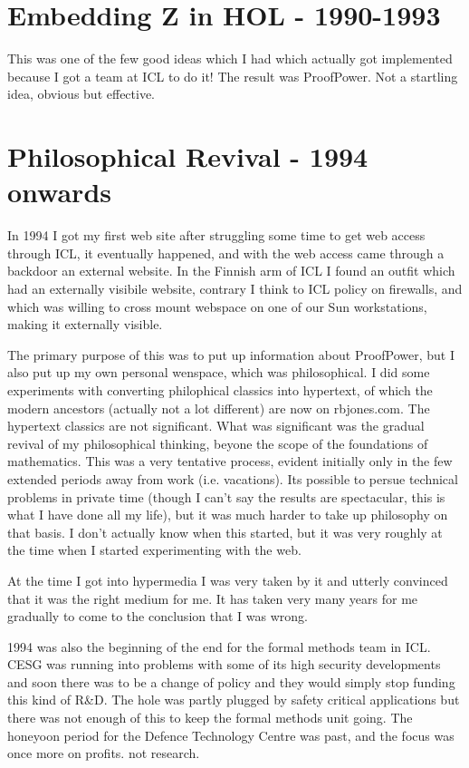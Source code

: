 \documentclass[10pt,titlepage]{book}
\begin{document}
\section{Embedding Z in HOL - 1990-1993}

This was one of the few good ideas which I had which actually got implemented because I got a team at ICL to do it!
The result was ProofPower.
Not a startling idea, obvious but effective.

\section{Philosophical Revival - 1994 onwards}

In 1994 I got my first web site after struggling some time to get web access through ICL, it eventually happened, and with the web access came through a backdoor an external website.
In the Finnish arm of ICL I found an outfit which had an externally visibile website, contrary I think to ICL policy on firewalls, and which was willing to cross mount webspace on one of our Sun workstations, making it externally visible.

The primary purpose of this was to put up information about ProofPower, but I also put up my own personal wenspace, which was philosophical.
I did some experiments with converting philophical classics into hypertext, of which the modern ancestors (actually not a lot different) are now on rbjones.com.
The hypertext classics are not significant.
What was significant was the gradual revival of my philosophical thinking, beyone the scope of the foundations of mathematics.
This was a very tentative process, evident initially only in the few extended periods away from work (i.e. vacations).
Its possible to persue technical problems in private time (though I can't say the results are spectacular, this is what I have done all my life), but it was much harder to take up philosophy on that basis.
I don't actually know when this started, but it was very roughly at the time when I started experimenting with the web.

At the time I got into hypermedia I was very taken by it and utterly convinced that it was the right medium for me.
It has taken very many years for me gradually to come to the conclusion that I was wrong.

1994 was also the beginning of the end for the formal methods team in ICL.
CESG was running into problems with some of its high security developments and soon there was to be a change of policy and they would simply stop funding this kind of R\&D.
The hole was partly plugged by safety critical applications but there was not enough of this to keep the formal methods unit going.
The honeyoon period for the Defence Technology Centre was past, and the focus was once more on profits. not research.
\end{document}

